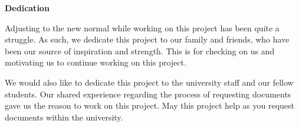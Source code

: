 \begin{center}
	\textbf{Dedication}
\end{center}

Adjusting to the new normal while working on this project has been quite a struggle. As such, we dedicate this project to our family and friends, who have been our source of inspiration and strength. This is for checking on us and motivating us to continue working on this project.

We would also like to dedicate this project to the university staff and our fellow students. Our shared experience regarding the process of requesting documents gave us the reason to work on this project. May this project help as you request documents within the university.
